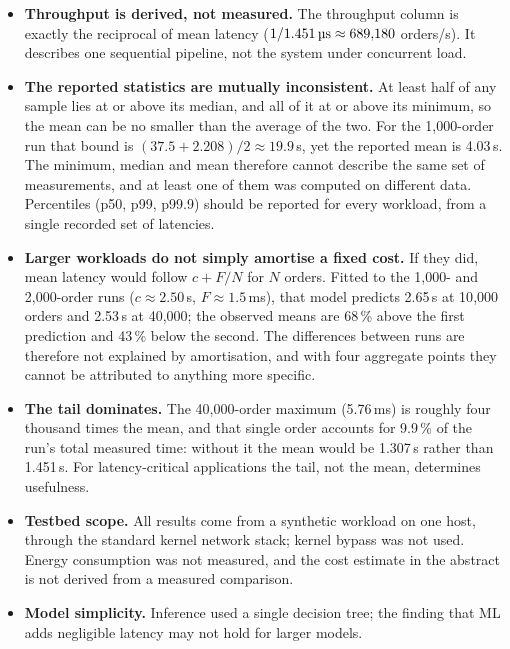 \documentclass[10pt,a4paper,twocolumn]{article}
\newcommand{\us}{\,\textmu s}
\begin{document}
\begin{itemize}
  \item \textbf{Throughput is derived, not measured.} The throughput column is exactly the
        reciprocal of mean latency ($1/1.451\,\text{\textmu s} \approx 689{,}180$ orders/s).
        It describes one sequential pipeline, not the system under concurrent load.
  \item \textbf{The reported statistics are mutually inconsistent.} At least half of any
        sample lies at or above its median, and all of it at or above its minimum, so the
        mean can be no smaller than the average of the two. For the 1{,}000-order run that
        bound is $(37.5 + 2.208)/2 \approx 19.9$\us, yet the reported mean is 4.03\us. The
        minimum, median and mean therefore cannot describe the same set of measurements, and
        at least one of them was computed on different data. Percentiles (p50, p99, p99.9)
        should be reported for every workload, from a single recorded set of latencies.
  \item \textbf{Larger workloads do not simply amortise a fixed cost.} If they did, mean
        latency would follow $c + F/N$ for $N$ orders. Fitted to the 1{,}000- and 2{,}000-order
        runs ($c \approx 2.50$\us, $F \approx 1.5$\,ms), that model predicts 2.65\us{} at
        10{,}000 orders and 2.53\us{} at 40{,}000; the observed means are 68\,\% above the first
        prediction and 43\,\% below the second. The differences between runs are therefore not
        explained by amortisation, and with four aggregate points they cannot be attributed
        to anything more specific.
  \item \textbf{The tail dominates.} The 40{,}000-order maximum (5.76\,ms) is roughly four
        thousand times the mean, and that single order accounts for 9.9\,\% of the run's
        total measured time: without it the mean would be 1.307\us{} rather than 1.451\us.
        For latency-critical applications the tail, not the mean, determines usefulness.
  \item \textbf{Testbed scope.} All results come from a synthetic workload on one host,
        through the standard kernel network stack; kernel bypass was not used. Energy
        consumption was not measured, and the cost estimate in the abstract is not derived
        from a measured comparison.
  \item \textbf{Model simplicity.} Inference used a single decision tree; the finding that
        ML adds negligible latency may not hold for larger models.
\end{itemize}
\end{document}
